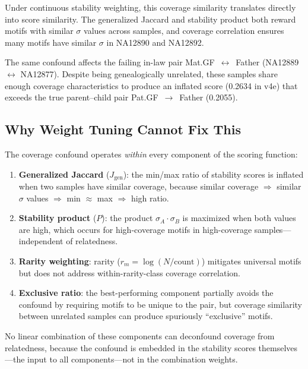 \documentclass{../yalumba}
\begin{document}

Under continuous stability weighting, this coverage similarity translates
directly into score similarity.  The generalized Jaccard and stability product
both reward motifs with similar $\sigma$ values across samples, and coverage
correlation ensures many motifs have similar $\sigma$ in NA12890 and NA12892.

The same confound affects the failing in-law pair
Mat.GF~$\leftrightarrow$~Father (NA12889 $\leftrightarrow$ NA12877).  Despite
being genealogically unrelated, these samples share enough coverage
characteristics to produce an inflated score (0.2634 in v4e) that exceeds the
true parent--child pair Pat.GF~$\to$~Father (0.2055).

\subsection{Why Weight Tuning Cannot Fix This}

The coverage confound operates \emph{within} every component of the scoring
function:

\begin{enumerate}
  \item \textbf{Generalized Jaccard} ($J_{\text{gen}}$): the min/max ratio
    of stability scores is inflated when two samples have similar coverage,
    because similar coverage $\Rightarrow$ similar $\sigma$ values
    $\Rightarrow$ min $\approx$ max $\Rightarrow$ high ratio.
  \item \textbf{Stability product} ($P$): the product $\sigma_A \cdot \sigma_B$
    is maximized when both values are high, which occurs for high-coverage
    motifs in high-coverage samples---independent of relatedness.
  \item \textbf{Rarity weighting}: rarity ($r_m = \log(N/\text{count})$)
    mitigates universal motifs but does not address within-rarity-class
    coverage correlation.
  \item \textbf{Exclusive ratio}: the best-performing component partially
    avoids the confound by requiring motifs to be unique to the pair, but
    coverage similarity between unrelated samples can produce spuriously
    ``exclusive'' motifs.
\end{enumerate}

No linear combination of these components can deconfound coverage from
relatedness, because the confound is embedded in the stability scores
themselves---the input to all components---not in the combination weights.
\end{document}
